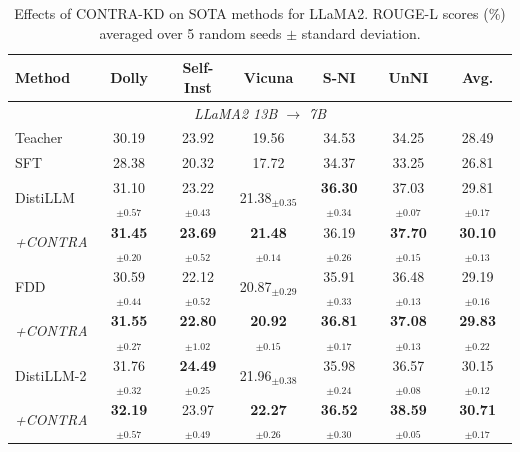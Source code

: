 \documentclass{article} %
\theoremstyle{definition}
\theoremstyle{remark}
\begin{document}
\begin{table}[htbp]
\centering
\small
\setlength{\tabcolsep}{4.5pt}
\caption{Effects of CONTRA-KD on SOTA methods for LLaMA2. ROUGE-L scores (\%) averaged over 5 random seeds $\pm$ standard deviation.}
\label{app:results}
\begin{tabular}{lcccccc}
\toprule
\textbf{Method} & \textbf{Dolly} & \textbf{Self-Inst} & \textbf{Vicuna} & \textbf{S-NI} & \textbf{UnNI} & \textbf{Avg.} \\
\midrule
\multicolumn{7}{c}{\textit{LLaMA2 13B $\rightarrow$ 7B}} \\
\midrule
Teacher    & 30.19 & 23.92 & 19.56 & 34.53 & 34.25 & 28.49 \\
SFT        & 28.38 & 20.32 & 17.72 & 34.37 & 33.25 & 26.81 \\
\midrule
DistiLLM   & 31.10$_{\pm 0.57}$ & 23.22$_{\pm 0.43}$ & 21.38$_{\pm 0.35}$ & \textbf{36.30}$_{\pm 0.34}$ & 37.03$_{\pm 0.07}$ & 29.81$_{\pm 0.17}$ \\
\textit{+CONTRA}
           & \textbf{31.45}$_{\pm 0.20}$ & \textbf{23.69}$_{\pm 0.52}$ & \textbf{21.48}$_{\pm 0.14}$ & 36.19$_{\pm 0.26}$ & \textbf{37.70}$_{\pm 0.15}$ & \textbf{30.10}$_{\pm 0.13}$ \\
\midrule
FDD        & 30.59$_{\pm 0.44}$ & 22.12$_{\pm 0.52}$ & 20.87$_{\pm 0.29}$ & 35.91$_{\pm 0.33}$ & 36.48$_{\pm 0.13}$ & 29.19$_{\pm 0.16}$ \\
\textit{+CONTRA}
           & \textbf{31.55}$_{\pm 0.27}$ & \textbf{22.80}$_{\pm 1.02}$ & \textbf{20.92}$_{\pm 0.15}$ & \textbf{36.81}$_{\pm 0.17}$ & \textbf{37.08}$_{\pm 0.13}$ & \textbf{29.83}$_{\pm 0.22}$ \\
\midrule
DistiLLM-2 & 31.76$_{\pm 0.32}$ & \textbf{24.49}$_{\pm 0.25}$ & 21.96$_{\pm 0.38}$ & 35.98$_{\pm 0.24}$ & 36.57$_{\pm 0.08}$ & 30.15$_{\pm 0.12}$ \\
\textit{+CONTRA}
           & \textbf{32.19}$_{\pm 0.57}$ & 23.97$_{\pm 0.49}$ & \textbf{22.27}$_{\pm 0.26}$ & \textbf{36.52}$_{\pm 0.30}$ & \textbf{38.59}$_{\pm 0.05}$ & \textbf{30.71}$_{\pm 0.17}$ \\
\bottomrule
\end{tabular}
\end{table}
\end{document}

